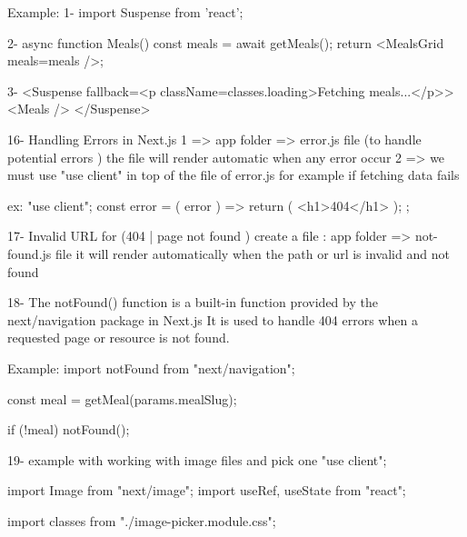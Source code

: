             Example: 
               1- import { Suspense } from 'react';

               2- async function Meals() {
                        const meals = await getMeals();
                        return <MealsGrid meals={meals} />;
                    }

                3-  <Suspense fallback={<p className={classes.loading}>Fetching meals...</p>}>
                            <Meals />
                    </Suspense>

16- Handling Errors in Next.js
       1 => app folder => error.js file (to handle potential errors ) the file will render automatic when any error occur
       2 => we must use "use client" in top of the file of error.js
          for example if fetching data fails

        ex:
            "use client";
            const error = ({ error }) => {
            return (
                <h1>404</h1>
            );
            };

17- Invalid URL for (404 | page not found )
        create a file : app folder => not-found.js file 
            it will render automatically when the path or url is invalid and not found 

18- The notFound() function is a built-in function provided by the next/navigation package in Next.js
    It is used to handle 404 errors when a requested page or resource is not found.

    Example:
        import { notFound } from "next/navigation";

        const meal = getMeal(params.mealSlug);

        if (!meal) {
            notFound();
        }

19- example with working with image files and pick one
                    "use client";

                    import Image from "next/image";
                    import { useRef, useState } from "react";

                    import classes from "./image-picker.module.css";

